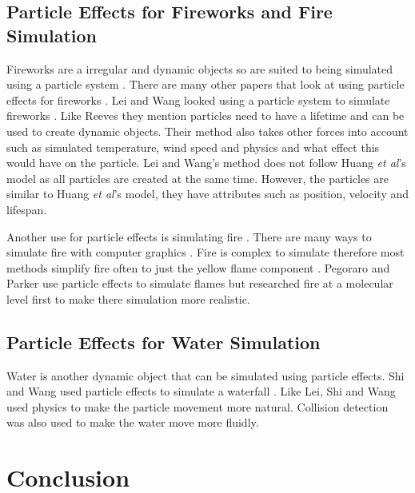 \documentclass{scrartcl}
\begin{document}
\subsection{Particle Effects for Fireworks and Fire Simulation}
Fireworks are a irregular and dynamic objects so are suited to being simulated using a particle system \cite{Lei, Reeves}. There are many other papers that look at using particle effects for fireworks \cite{Lei, Dong, Zhang}. Lei and Wang looked using a particle system to simulate fireworks \cite{Lei}. Like Reeves they mention particles need to have a lifetime and can be used to create dynamic objects. Their method also takes other forces into account such as simulated temperature, wind speed and physics and what effect this would have on the particle\cite{Lei}. Lei and Wang's method does not follow Huang \textit{et al}'s model as all particles are created at the same time. However, the particles are similar to Huang \textit{et al}'s model, they have attributes such as position, velocity and lifespan.

\bigskip
Another use for particle effects is simulating fire \cite{Pegoraro}. There are many ways to simulate fire with computer graphics \cite{BridaultLouchez, Beaudoin, Lamorlette}. Fire is complex to simulate therefore most methods simplify fire often to just the yellow flame component \cite{Pegoraro}.  Pegoraro and Parker use particle effects to simulate flames but researched fire at a molecular level first to make there simulation more realistic. 

\subsection{Particle Effects for Water Simulation}
Water is another dynamic object that can be simulated using particle effects. Shi and Wang used particle effects to simulate a waterfall \cite{Shi}. Like Lei, Shi and Wang used physics to make the particle movement more natural. Collision detection was also used to make the water move more fluidly.


\section{Conclusion}

	


	
\end{document}
